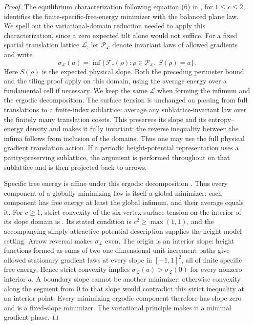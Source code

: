 \begin{proof}
The equilibrium characterization following equation (6) in
\cite{DKLM2026}, for $1\le c\le2$, identifies the
finite-specific-free-energy minimizer with the balanced plane law.
We spell out the variational-domain reduction needed to apply this
characterization, since a zero expected tilt alone would not suffice.
For a fixed spatial translation lattice $\mathcal L$, let
$\mathcal P_{\mathcal L}$ denote invariant laws of allowed gradients and
write
\[
 \sigma_{\mathcal L}(a)
  =\inf\{\mathcal F_c(\rho):\rho\in\mathcal P_{\mathcal L},\ S(\rho)=a\}.
\]
Here $S(\rho)$ is the expected physical slope.  Both the preceding
perimeter bound and the tiling proof apply on this domain, using the
average energy over a fundamental cell if necessary.  We keep the same
$\mathcal L$ when forming the infimum and the ergodic decomposition.
The surface tension is unchanged on passing from full translations to
a finite-index sublattice: average any sublattice-invariant law over
the finitely many translation cosets.  This preserves its slope and
its entropy--energy density and makes it fully invariant; the reverse
inequality between the infima follows from inclusion of the domains.
Thus one may use the full physical gradient translation action.  If a
periodic height-potential representation uses a parity-preserving
sublattice, the argument is performed throughout on that sublattice
and is then projected back to arrows.

Specific free energy is affine under this ergodic decomposition
\cite[Chapter 3]{Sheffield2005}.  Thus every component of a globally
minimizing law is itself a global minimizer: each component has free
energy at least the global infimum, and their average equals it.
For $c\ge1$, strict convexity of the six-vertex surface tension on the
interior of its slope domain is
\cite[Theorem 13.16 of the 2020 preprint]{LammersTassy2024}.
Its stated condition is $c^2\ge\max(1,1)$, and the accompanying
simply-attractive-potential description supplies the height-model
setting.  Arrow reversal makes $\sigma_{\mathcal L}$ even.  The origin
is an interior slope: height functions formed as sums of two
one-dimensional unit-increment paths give allowed stationary gradient
laws at every slope in $[-1,1]^2$, all of finite specific free energy.
Hence strict convexity implies
$\sigma_{\mathcal L}(a)>\sigma_{\mathcal L}(0)$ for every nonzero
interior $a$.  A boundary slope cannot be another minimizer: otherwise
convexity along the segment from $0$ to that slope would contradict
this strict inequality at an interior point.  Every minimizing ergodic
component therefore has slope zero and is a fixed-slope minimizer.
The variational principle makes it a minimal gradient phase.


\end{proof}
